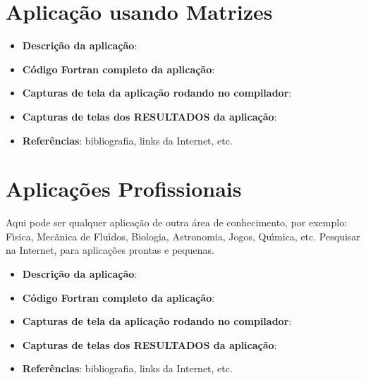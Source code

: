     \section{Aplica\c{c}\~{a}o usando Matrizes}
    \begin{itemize}
      \item \textbf{Descri\c{c}\~{a}o da aplica\c{c}\~{a}o}:
      \item \textbf{C\'{o}digo Fortran completo da aplica\c{c}\~{a}o}:
      \item \textbf{Capturas de tela da aplica\c{c}\~{a}o rodando no compilador}:
      \item \textbf{Capturas de telas dos RESULTADOS da aplica\c{c}\~{a}o}:
      \item \textbf{Refer\^{e}ncias}: bibliografia, links da Internet, etc.
    \end{itemize}

    \section{Aplica\c{c}\~{o}es Profissionais}
    Aqui pode ser qualquer aplica\c{c}\~{a}o de outra \'{a}rea de conhecimento, por exemplo: F\'{\i}sica, Mec\~{a}nica de Flu\'{\i}dos, Biologia, Astronomia, Jogos, Qu\'{\i}mica, etc. Pesquisar na Internet, para aplica\c{c}\~{o}es prontas e pequenas.
    \begin{itemize}
      \item \textbf{Descri\c{c}\~{a}o da aplica\c{c}\~{a}o}:
      \item \textbf{C\'{o}digo Fortran completo da aplica\c{c}\~{a}o}:
      \item \textbf{Capturas de tela da aplica\c{c}\~{a}o rodando no compilador}:
      \item \textbf{Capturas de telas dos RESULTADOS da aplica\c{c}\~{a}o}:
      \item \textbf{Refer\^{e}ncias}: bibliografia, links da Internet, etc.
    \end{itemize}

